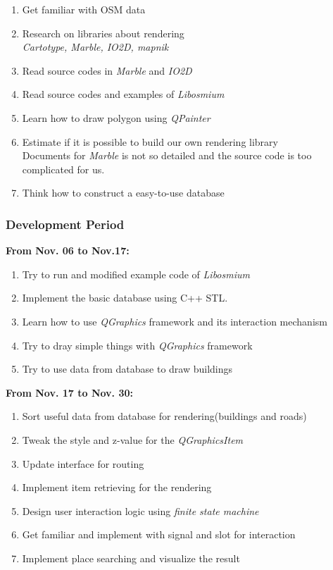 \documentclass[a4paper, 12pt, english]{book}
\begin{document}
\begin{enumerate}
	\item Get familiar with OSM data
	\item Research on libraries about rendering\\
	{\textit{Cartotype, Marble, IO2D, mapnik}}
	\item Read source codes in {\textit{Marble}} and {\textit{IO2D}}
	\item Read source codes and examples of {\textit{Libosmium}}
	\item Learn how to draw polygon using {\textit{QPainter}}
	\item Estimate if it is possible to build our own rendering library\\
	Documents for {\textit{Marble}} is not so detailed and the source code is too complicated for us.
	\item Think how to construct a easy-to-use database
\end{enumerate}


\subsubsection{Development Period}

	{\textbf{From Nov. 06 to Nov.17:}}

\begin{enumerate}

	\item Try to run and modified example code of {\textit{Libosmium}}
	\item Implement the basic database using C++ STL.
	\item Learn how to use {\textit{QGraphics}} framework and its interaction mechanism
	\item Try to dray simple things with {\textit{QGraphics}} framework
	\item Try to use data from database to draw buildings
	
\end{enumerate}

	{\textbf{From Nov. 17 to Nov. 30:}}
\begin{enumerate}
	\item Sort useful data from database for rendering(buildings and roads)
	\item Tweak the style and z-value for the {\textit{QGraphicsItem}}
	\item Update interface for routing
	\item Implement item retrieving for the rendering
	\item Design user interaction logic using {\textit{finite state machine}}
	\item Get familiar and implement with signal and slot for interaction
 	\item Implement place searching and visualize the result
\end{enumerate}
\end{document}
